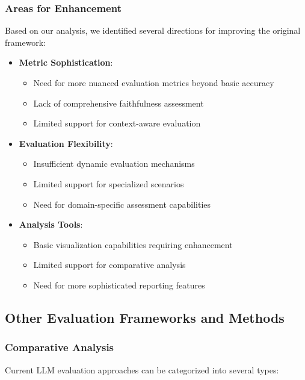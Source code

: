 \subsubsection{Areas for Enhancement}
Based on our analysis, we identified several directions for improving the original framework:
\begin{itemize}
    \item \textbf{Metric Sophistication}:
    \begin{itemize}
        \item Need for more nuanced evaluation metrics beyond basic accuracy
        \item Lack of comprehensive faithfulness assessment
        \item Limited support for context-aware evaluation
    \end{itemize}
    
    \item \textbf{Evaluation Flexibility}:
    \begin{itemize}
        \item Insufficient dynamic evaluation mechanisms
        \item Limited support for specialized scenarios
        \item Need for domain-specific assessment capabilities
    \end{itemize}
    
    \item \textbf{Analysis Tools}:
    \begin{itemize}
        \item Basic visualization capabilities requiring enhancement
        \item Limited support for comparative analysis
        \item Need for more sophisticated reporting features
    \end{itemize}
\end{itemize}

\subsection{Other Evaluation Frameworks and Methods}

\subsubsection{Comparative Analysis}
Current LLM evaluation approaches can be categorized into several types:

